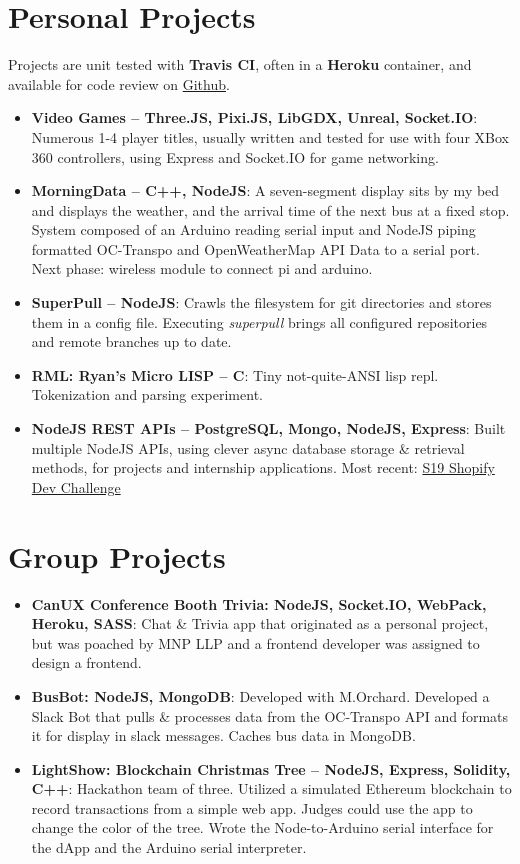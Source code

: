 \documentclass[letterpaper,11pt]{article}
\newcommand{\resumeItem}[2]{
  \item\small{
    \textbf{#1}{: #2 \vspace{-2pt}}
  }
}
\newcommand{\resumeSubItem}[2]{\resumeItem{#1}{#2}\vspace{-4pt}}
\newcommand{\resumeSubHeadingListStart}{\begin{itemize}[leftmargin=*]}
\newcommand{\resumeSubHeadingListEnd}{\end{itemize}}
\begin{document}
\section{Personal Projects}
Projects are unit tested with \textbf{Travis CI}, often in a \textbf{Heroku} container, and available for code review on \href{https://github.com/ryanfleck}{Github}.
  \resumeSubHeadingListStart
    \resumeSubItem{Video Games -- Three.JS, Pixi.JS, LibGDX, Unreal, Socket.IO}
      {Numerous 1-4 player titles, usually written and tested for use with four XBox 360 controllers, using Express and Socket.IO for game networking.}
    \resumeSubItem{MorningData -- C++, NodeJS}
      {A seven-segment display sits by my bed and displays the weather, and the arrival time of the next bus at a fixed stop. System composed of an Arduino reading serial input and NodeJS piping formatted OC-Transpo and OpenWeatherMap API Data to a serial port. Next phase: wireless module to connect pi and arduino.}
    \resumeSubItem{SuperPull -- NodeJS}
      {Crawls the filesystem for git directories and stores them in a config file. Executing \emph{superpull} brings all configured repositories and remote branches up to date.}
    \resumeSubItem{RML: Ryan's Micro LISP -- C}
      {Tiny not-quite-ANSI lisp repl.  Tokenization and parsing experiment.}
    \resumeSubItem{NodeJS REST APIs -- PostgreSQL, Mongo, NodeJS, Express}
      {Built multiple NodeJS APIs, using clever async database storage \& retrieval methods, for projects and internship applications. Most recent: \href{https://github.com/RyanFleck/Shopify-Challenge-S19}{S19 Shopify Dev Challenge}}
  \resumeSubHeadingListEnd
  
\section{Group Projects}
  \resumeSubHeadingListStart
    \resumeSubItem{CanUX Conference Booth Trivia: NodeJS, Socket.IO, WebPack, Heroku, SASS}
      {Chat \& Trivia app that originated as a personal project, but was poached by MNP LLP and a frontend developer was assigned to design a frontend.}
    \resumeSubItem{BusBot: NodeJS, MongoDB}
      {Developed with M.Orchard. Developed a Slack Bot that pulls \& processes data from the OC-Transpo API and formats it for display in slack messages. Caches bus data in MongoDB.}
       \resumeSubItem{LightShow: Blockchain Christmas Tree -- NodeJS, Express, Solidity, C++}
      {Hackathon team of three. Utilized a simulated Ethereum blockchain to record transactions from a simple web app. Judges could use the app to change the color of the tree. Wrote the Node-to-Arduino serial interface for the dApp and the Arduino serial interpreter.}
  \resumeSubHeadingListEnd
\end{document}
